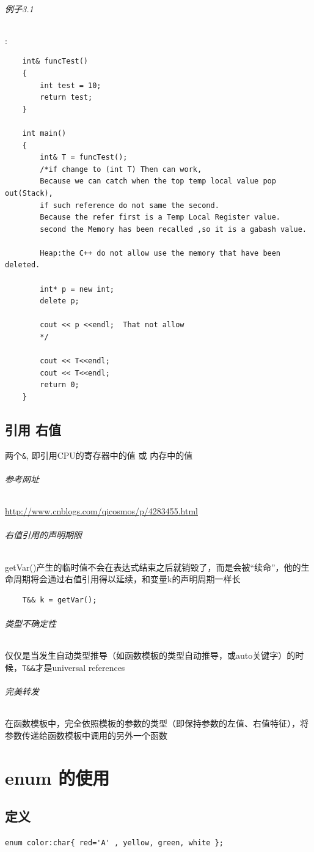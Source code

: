 \documentclass[UTF8,a4paper,12pt]{ctexbook} %
\begin{document}
	       \subparagraph{例子3.1}:
	       
		       \begin{lstlisting}
	int& funcTest()
	{
		int test = 10;
		return test;
	}
	
	int main()
	{
		int& T = funcTest();
		/*if change to (int T) Then can work,
		Because we can catch when the top temp local value pop out(Stack), 
		if such reference do not same the second. 
		Because the refer first is a Temp Local Register value.
		second the Memory has been recalled ,so it is a gabash value.
		
		Heap:the C++ do not allow use the memory that have been deleted.
		
		int* p = new int;
		delete p;
		
		cout << p <<endl;  That not allow
		*/
		
		cout << T<<endl;
		cout << T<<endl;
		return 0;
	}		       	
		       \end{lstlisting}
   
	\section{引用 右值} 两个\verb|&|, 即引用CPU的寄存器中的值 或 内存中的值
			\subparagraph{参考网址}\url{http://www.cnblogs.com/qicosmos/p/4283455.html}
			
			\subparagraph{右值引用的声明期限}getVar()产生的临时值不会在表达式结束之后就销毁了，而是会被“续命”，他的生命周期将会通过右值引用得以延续，和变量k的声明周期一样长
				\begin{lstlisting}
	T&& k = getVar();
				\end{lstlisting}
				
			\subparagraph{类型不确定性}仅仅是当发生自动类型推导（如函数模板的类型自动推导，或auto关键字）的时候，\verb|T&&|才是universal references
			
			\subparagraph{完美转发}在函数模板中，完全依照模板的参数的类型（即保持参数的左值、右值特征），将参数传递给函数模板中调用的另外一个函数
	   
\chapter{enum 的使用}

	\section{定义}
		    \verb|enum color:char{ red='A' , yellow, green, white };|
		    
\end{document}
